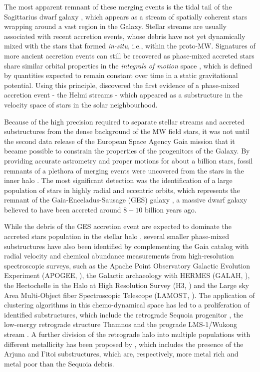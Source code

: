 The most apparent remnant of these merging events is the tidal tail of the Sagittarius dwarf galaxy \citep{Ibata1994}, which appears as a stream of spatially coherent stars wrapping around a vast region in the Galaxy. Stellar streams are usually associated with recent accretion events, whose debris have not yet dynamically mixed with the stars that formed \textit{in-situ}, i.e., within the proto-MW. Signatures of more ancient accretion events can still be recovered as phase-mixed accreted stars share similar orbital properties in the \textit{integrals of motion} space \citep{Helmi1999a}, which is defined by quantities expected to remain constant over time in a static gravitational potential. Using this principle, \citet{Helmi1999b} discovered the first evidence of a phase-mixed accretion event - the Helmi streams -  which appeared as a substructure in the velocity space of stars in the solar neighbourhood. 

Because of the high precision required to separate stellar streams and accreted substructures from the dense background of the MW field stars, it was not until the second data release of the European Space Agency Gaia mission \citep{GaiaCollaboration2018} that it became possible to constrain the properties of the progenitors of the Galaxy. By providing accurate astrometry and proper motions for about a billion stars, fossil remnants of a plethora of merging events were uncovered from the stars in the inner halo \citep[for reviews see][]{Deason2024,Bonaca2025}. The most significant detection was the identification of a large population of stars in highly radial and eccentric orbits, which represents the remnant of the Gaia-Enceladus-Sausage (GES) galaxy \citep{Belokurov2018,Helmi2018}, a massive dwarf galaxy believed to have been accreted around $8-10$ billion years ago. 

While the debris of the GES accretion event are expected to dominate the accreted stars population in the stellar halo \citep{Naidu2020}, several smaller phase-mixed substructures have also been identified by complementing the Gaia catalog with radial velocity and chemical abundance measurements from high-resolution spectroscopic surveys, such as the Apache Point Observatory Galactic Evolution Experiment (APOGEE, \citealt{Majewski2017}), the Galactic archaeology with HERMES (GALAH, \citealt{Buder2021}), the Hectochelle in the Halo at High Resolution
Survey (H3, \citealt{Conroy2019}) and the Large sky Area Multi-Object fiber Spectroscopic Telescope (LAMOST, \citealt{Cui2012}). The application of clustering algorithms in this chemo-dynamical space has led to a proliferation of identified substructures, which include the retrograde Sequoia progenitor \citep{Myeong2019}, the low-energy retrograde structure Thamnos \citep{Koppelman2019} and the prograde LMS-1/Wukong stream \citep{Yuan2020}. A further division of the retrograde halo into multiple populations with different metallicity has been proposed by \citet{Naidu2020}, which includes the presence of the Arjuna and I'itoi substructures, which are, respectively, more metal rich and metal poor than the Sequoia debris.


